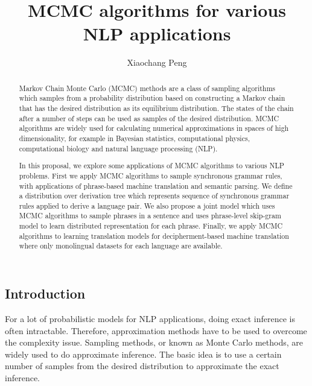 \documentclass[12pt,leqno]{report}
\begin{document}
\begin{CJK}{UTF8}{cyberbit}

\title{MCMC algorithms for various NLP applications}
\author{Xiaochang Peng}


\maketitle

\thispagestyle{empty}

\begin{abstract}
Markov Chain Monte Carlo (MCMC) methods are a class of sampling algorithms which samples from a probability distribution based on constructing a Markov chain that has the desired distribution as its equilibrium distribution. The states of the chain after a number of steps can be used as samples of the desired distribution. 
MCMC algorithms are widely used for calculating numerical approximations in spaces of high dimensionality, for example in Bayesian statistics, computational physics, computational biology and natural language processing (NLP).


In this proposal, we explore some applications of MCMC algorithms to various NLP problems. First we apply MCMC algorithms to sample synchronous grammar rules, with applications of phrase-based machine translation and semantic parsing. We define a distribution over derivation tree which represents sequence of synchronous grammar rules applied to derive a language pair. We also propose a joint model which uses MCMC algorithms to sample phrases in a sentence and uses phrase-level
skip-gram model to learn distributed representation for each phrase. Finally, we apply MCMC algorithms to learning translation models for decipherment-based machine translation where only monolingual datasets for each language are available.
\end{abstract}

\tableofcontents

\chapter{Introduction}

For a lot of probabilistic models for NLP applications, doing exact inference is often intractable. Therefore, approximation methods have to be used to overcome the
complexity issue. Sampling methods, or known as Monte Carlo methods, are widely used to do approximate inference. The basic idea is to use a certain number of
samples from the desired distribution to approximate the exact inference.



\end{CJK}
\end{document}
